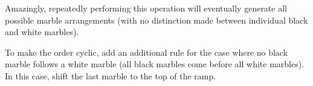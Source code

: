 Amazingly, repeatedly performing this operation will eventually generate all possible marble arrangements (with no distinction made between individual black and white marbles). 


To make the order cyclic, add an additional rule for the case where 
no black marble follows a white marble (all black marbles come before all white marbles).  In this case, shift the last marble to the top of the ramp.


  

  


  

  

